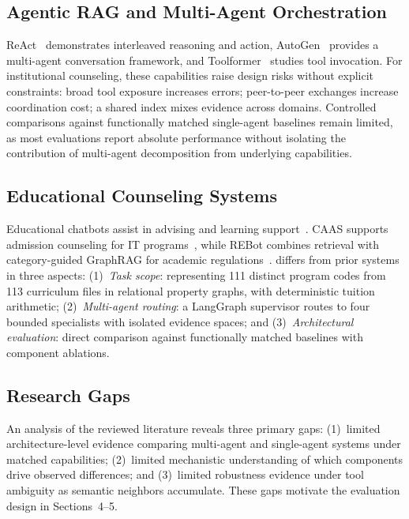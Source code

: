 \subsection{Agentic RAG and Multi-Agent Orchestration}
\label{sec:agentic_multiagent}

ReAct~\cite{yao2023react} demonstrates interleaved reasoning and action, AutoGen~\cite{wu2023autogen} provides a multi-agent conversation framework, and Toolformer~\cite{schick2023toolformer} studies tool invocation. For institutional counseling, these capabilities raise design risks without explicit constraints: broad tool exposure increases errors; peer-to-peer exchanges increase coordination cost; a shared index mixes evidence across domains. Controlled comparisons against functionally matched single-agent baselines remain limited, as most evaluations report absolute performance without isolating the contribution of multi-agent decomposition from underlying capabilities.

\subsection{Educational Counseling Systems}
\label{sec:educational_counseling}

Educational chatbots assist in advising and learning support~\cite{wollny2021chatbots}. CAAS supports admission counseling for IT programs~\cite{ma2023caas}, while REBot combines retrieval with category-guided GraphRAG for academic regulations~\cite{ma2025rebot}. \system{} differs from prior systems in three aspects: (1)~\emph{Task scope}: representing 111 distinct program codes from 113 curriculum files in relational property graphs, with deterministic tuition arithmetic; (2)~\emph{Multi-agent routing}: a LangGraph supervisor routes to four bounded specialists with isolated evidence spaces; and (3)~\emph{Architectural evaluation}: direct comparison against functionally matched baselines with component ablations.

\subsection{Research Gaps}
\label{sec:gaps}

An analysis of the reviewed literature reveals three primary gaps: (1)~limited architecture-level evidence comparing multi-agent and single-agent systems under matched capabilities; (2)~limited mechanistic understanding of which components drive observed differences; and (3)~limited robustness evidence under tool ambiguity as semantic neighbors accumulate. These gaps motivate the evaluation design in Sections~4--5.
